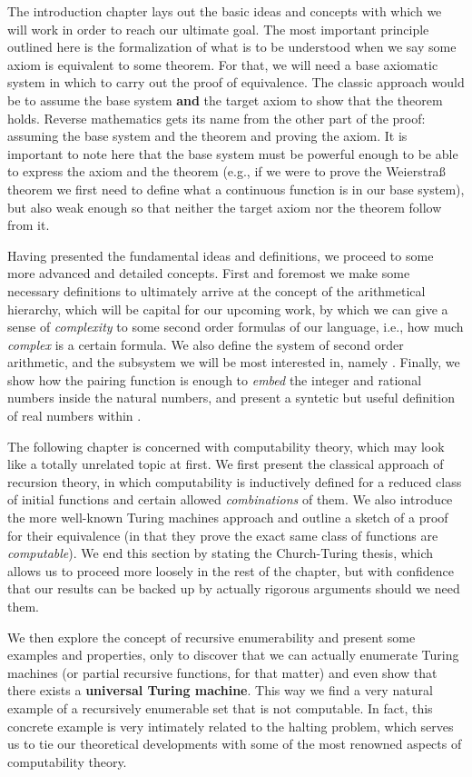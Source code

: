 \documentclass[../main.tex]{memoir}
\begin{document}
The introduction chapter lays out the basic ideas and concepts with which we will work in order to reach our ultimate goal. The most important principle outlined here is the formalization of what is to be understood when we say some axiom is equivalent to some theorem. For that, we will need a base axiomatic system in which to carry out the proof of equivalence. The classic approach would be to assume the base system \textbf{and} the target axiom to show that the theorem holds. Reverse mathematics gets its name from the other part of the proof: assuming the base system and the theorem and proving the axiom. It is important to note here that the base system must be powerful enough to be able to express the axiom and the theorem (e.g., if we were to prove the Weierstra{\ss} theorem we first need to define what a continuous function is in our base system), but also weak enough so that neither the target axiom nor the theorem follow from it.

Having presented the fundamental ideas and definitions, we proceed to some more advanced and detailed concepts. First and foremost we make some necessary definitions to ultimately arrive at the concept of the arithmetical hierarchy, which will be capital for our upcoming work, by which we can give a sense of \textit{complexity} to some second order formulas of our language, i.e., how much \textit{complex} is a certain formula. We also define the system of second order arithmetic, and the subsystem we will be most interested in, namely \rca. Finally, we show how the pairing function is enough to \textit{embed} the integer and rational numbers inside the natural numbers, and present a syntetic but useful definition of real numbers within \rca.

The following chapter is concerned with computability theory, which may look like a totally unrelated topic at first. We first present the classical approach of recursion theory, in which computability is inductively defined for a reduced class of initial functions and certain allowed \textit{combinations} of them. We also introduce the more well-known Turing machines approach and outline a sketch of a proof for their equivalence (in that they prove the exact same class of functions are \textit{computable}). We end this section by stating the Church-Turing thesis, which allows us to proceed more loosely in the rest of the chapter, but with confidence that our results can be backed up by actually rigorous arguments should we need them.

We then explore the concept of recursive enumerability and present some examples and properties, only to discover that we can actually enumerate Turing machines (or partial recursive functions, for that matter) and even show that there exists a \textbf{universal Turing machine}. This way we find a very natural example of a recursively enumerable set that is not computable. In fact, this concrete example is very intimately related to the halting problem, which serves us to tie our theoretical developments with some of the most renowned aspects of computability theory.
\end{document}
